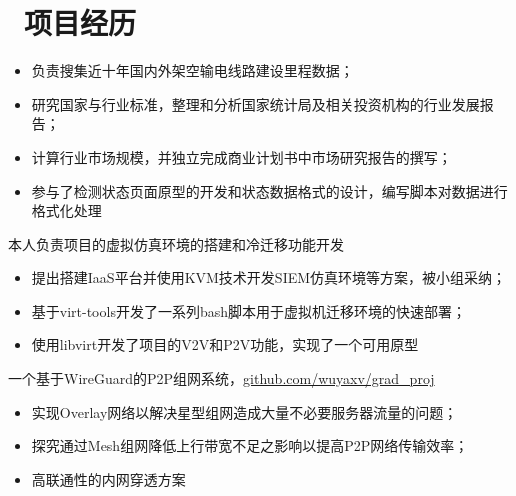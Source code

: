\documentclass{resume}
\begin{document}
\section{\faUsers\ 项目经历}
\begin{itemize}
  \item 负责搜集近十年国内外架空输电线路建设里程数据；
  \item 研究国家与行业标准，整理和分析国家统计局及相关投资机构的行业发展报告；
  \item 计算行业市场规模，并独立完成商业计划书中市场研究报告的撰写；
  \item 参与了检测状态页面原型的开发和状态数据格式的设计，编写脚本对数据进行格式化处理
\end{itemize}
本人负责项目的虚拟仿真环境的搭建和冷迁移功能开发
\begin{itemize}
  \item 提出搭建IaaS平台并使用KVM技术开发SIEM仿真环境等方案，被小组采纳；
  \item 基于virt-tools开发了一系列bash脚本用于虚拟机迁移环境的快速部署；
  \item 使用libvirt开发了项目的V2V和P2V功能，实现了一个可用原型
\end{itemize}

一个基于WireGuard的P2P组网系统，\href{https://github.com/wuyaxv/grad_proj}{github.com/wuyaxv/grad\_proj}
\begin{itemize}
  \item 实现Overlay网络以解决星型组网造成大量不必要服务器流量的问题；
  \item 探究通过Mesh组网降低上行带宽不足之影响以提高P2P网络传输效率；
  \item 高联通性的内网穿透方案
\end{itemize}

\end{document}
